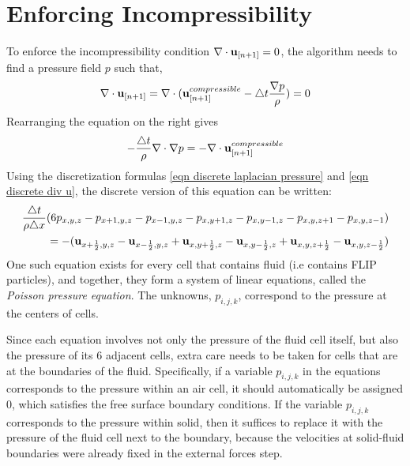 \section{Enforcing Incompressibility}
\label{section enforce incompressibility}
To enforce the incompressibility condition $\nabla \cdot \textbf{u}_{[n+1]} = 0$, the algorithm needs to find a pressure field $p$ such that,
\begin{equation*}
    \begin{aligned}
        \nabla \cdot \textbf{u}_{[n+1]} = \nabla \cdot
        ( \textbf{u}_{[n+1]}^{compressible} - \triangle t \frac{\nabla p}{\rho} ) = 0
    \end{aligned}
\end{equation*}
Rearranging the equation on the right gives
\begin{equation}
-\frac{\triangle t}{\rho} \nabla \cdot \nabla p = -\nabla \cdot \textbf{u}_{[n+1]}^{compressible}
\label{eqn pressure poisson continuous}
\end{equation}
Using the discretization formulas \ref{eqn discrete laplacian pressure} and \ref{eqn discrete div u}, the discrete version of this equation can be written: 
\begin{equation}
    \begin{aligned}
        \frac{\triangle t}{\rho \triangle x}(6p_{x,y,z}-p_{x+1,y,z}-p_{x-1,y,z}-p_{x,y+1,z}-p_{x,y-1,z}-p_{x,y,z+1}-p_{x,y,z-1}) \\
        = 
        -( \textbf{u}_{x+\frac{1}{2},y,z} - \textbf{u}_{x-\frac{1}{2},y,z}  +  
         \textbf{u}_{x,y+\frac{1}{2},z} - \textbf{u}_{x,y-\frac{1}{2},z} +
         \textbf{u}_{x,y,z+\frac{1}{2}} - \textbf{u}_{x,y,z-\frac{1}{2}})
    \end{aligned}
    \label{eqn poisson pressure}
\end{equation}
One such equation exists for every cell that contains fluid (i.e contains FLIP particles), and together, they form a system of linear equations, called the \textit{Poisson pressure equation}. The unknowns, $p_{i,j,k}$, correspond to the pressure at the centers of cells.

Since each equation involves not only the pressure of the fluid cell itself, but also the pressure of its 6 adjacent cells, extra care needs to be taken for cells that are at the boundaries of the fluid. Specifically, if a variable $p_{i,j,k}$ in the equations corresponds to the pressure within an air cell, it should automatically be assigned 0, which satisfies the free surface boundary conditions. If the variable $p_{i,j,k}$ corresponds to the pressure within solid, then it suffices to replace it with the pressure of the fluid cell next to the boundary, because the velocities at solid-fluid boundaries were already fixed in the external forces step.

